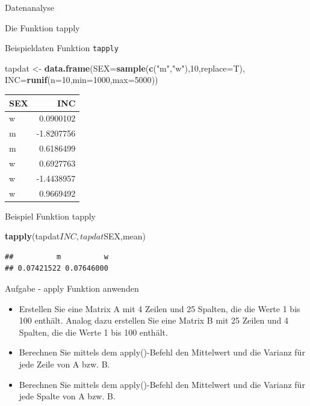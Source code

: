 \documentclass[ignorenonframetext,]{beamer}
\newenvironment{Shaded}{}{}
\newcommand{\KeywordTok}[1]{\textcolor[rgb]{0.00,0.44,0.13}{\textbf{{#1}}}}
\newcommand{\DataTypeTok}[1]{\textcolor[rgb]{0.56,0.13,0.00}{{#1}}}
\newcommand{\DecValTok}[1]{\textcolor[rgb]{0.25,0.63,0.44}{{#1}}}
\newcommand{\StringTok}[1]{\textcolor[rgb]{0.25,0.44,0.63}{{#1}}}
\newcommand{\NormalTok}[1]{{#1}}
\begin{document}
\begin{frame}[fragile]{Datenanalyse}
\begin{block}{Die Funktion tapply}
\end{block}

\begin{block}{Beispieldaten Funktion \texttt{tapply}}

\begin{Shaded}
\begin{Highlighting}[]
\NormalTok{tapdat <-}\StringTok{ }\KeywordTok{data.frame}\NormalTok{(}\DataTypeTok{SEX=}\KeywordTok{sample}\NormalTok{(}\KeywordTok{c}\NormalTok{(}\StringTok{"m"}\NormalTok{,}\StringTok{"w"}\NormalTok{),}\DecValTok{10}\NormalTok{,}\DataTypeTok{replace=}\NormalTok{T),}
                     \DataTypeTok{INC=}\KeywordTok{runif}\NormalTok{(}\DataTypeTok{n=}\DecValTok{10}\NormalTok{,}\DataTypeTok{min=}\DecValTok{1000}\NormalTok{,}\DataTypeTok{max=}\DecValTok{5000}\NormalTok{))}
\end{Highlighting}
\end{Shaded}

\begin{longtable}[]{@{}lr@{}}
\toprule
SEX & INC\tabularnewline
\midrule
\endhead
w & 0.0900102\tabularnewline
m & -1.8207756\tabularnewline
m & 0.6186499\tabularnewline
w & 0.6927763\tabularnewline
w & -1.4438957\tabularnewline
w & 0.9669492\tabularnewline
\bottomrule
\end{longtable}

\end{block}

\begin{block}{Beispiel Funktion tapply}

\begin{Shaded}
\begin{Highlighting}[]
\KeywordTok{tapply}\NormalTok{(tapdat$INC,tapdat$SEX,mean)}
\end{Highlighting}
\end{Shaded}

\begin{verbatim}
##          m          w 
## 0.07421522 0.07646000
\end{verbatim}

\end{block}

\begin{block}{Aufgabe - apply Funktion anwenden}

\begin{itemize}
\item
  Erstellen Sie eine Matrix A mit 4 Zeilen und 25 Spalten, die die Werte
  1 bis 100 enthält. Analog dazu erstellen Sie eine Matrix B mit 25
  Zeilen und 4 Spalten, die die Werte 1 bis 100 enthält.
\item
  Berechnen Sie mittels dem apply()-Befehl den Mittelwert und die
  Varianz für jede Zeile von A bzw. B.
\item
  Berechnen Sie mittels dem apply()-Befehl den Mittelwert und die
  Varianz für jede Spalte von A bzw. B.
\end{itemize}


\end{block}
\end{frame}
\end{document}
